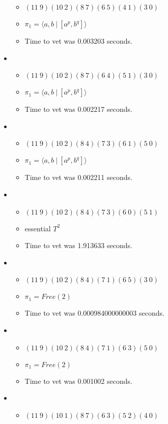 \documentclass{article}
\begin{document}
\begin{itemize}
\begin{itemize}
      \item $(11\ 9)(10\ 2)(8\ 7)(6\ 5)(4\ 1)(3\ 0)$
      \item $\pi_1 = \langle a,b\ |\ [a^p,b^q]\rangle$
      \item Time to vet was 0.003203 seconds.
\end{itemize}
\item \begin{itemize}
      \item $(11\ 9)(10\ 2)(8\ 7)(6\ 4)(5\ 1)(3\ 0)$
      \item $\pi_1 = \langle a,b\ |\ [a^p,b^q]\rangle$
      \item Time to vet was 0.002217 seconds.
\end{itemize}
\item \begin{itemize}
      \item $(11\ 9)(10\ 2)(8\ 4)(7\ 3)(6\ 1)(5\ 0)$
      \item $\pi_1 = \langle a,b\ |\ [a^p,b^q]\rangle$
      \item Time to vet was 0.002211 seconds.
\end{itemize}
\item \begin{itemize}
      \item $(11\ 9)(10\ 2)(8\ 4)(7\ 3)(6\ 0)(5\ 1)$
      \item essential $T^2$
      \item Time to vet was 1.913633 seconds.
\end{itemize}
\item \begin{itemize}
      \item $(11\ 9)(10\ 2)(8\ 4)(7\ 1)(6\ 5)(3\ 0)$
      \item $\pi_1 =Free(2)$
      \item Time to vet was 0.000984000000003 seconds.
\end{itemize}
\item \begin{itemize}
      \item $(11\ 9)(10\ 2)(8\ 4)(7\ 1)(6\ 3)(5\ 0)$
      \item $\pi_1 =Free(2)$
      \item Time to vet was 0.001002 seconds.
\end{itemize}
\item \begin{itemize}
      \item $(11\ 9)(10\ 1)(8\ 7)(6\ 3)(5\ 2)(4\ 0)$

\end{itemize}
\end{itemize}
\end{document}
